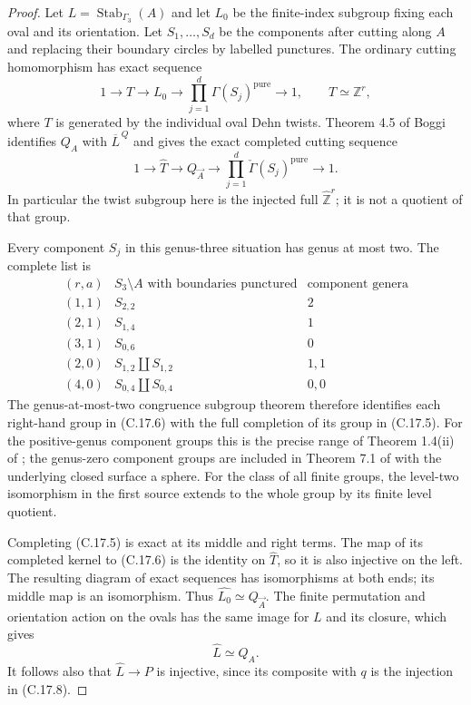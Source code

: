 \begin{proof}
Let $L=\operatorname{Stab}_{\Gamma_3}(A)$ and let $L_0$ be
the finite-index subgroup fixing each oval and its orientation.
Let $S_1,\ldots,S_d$ be the components after cutting along
$A$ and replacing their boundary circles by labelled
punctures. The ordinary cutting homomorphism has exact
sequence
\[
 1\longrightarrow T\longrightarrow L_0
       \longrightarrow\prod_{j=1}^{d}\Gamma(S_j)^{\mathrm{pure}}
       \longrightarrow1,\qquad T\simeq\mathbb Z^r,
\tag{C.17.5}
\]
where $T$ is generated by the individual oval Dehn twists.
Theorem 4.5 of Boggi~\cite{CextraBoggiProcongruence2014}
identifies $Q_A$ with $\overline L^{\,Q}$ and gives the exact
completed cutting sequence
\[
 1\longrightarrow\widehat T\longrightarrow Q_{\vec A}
       \longrightarrow\prod_{j=1}^{d}
                  \check\Gamma(S_j)^{\mathrm{pure}}
       \longrightarrow1.
\tag{C.17.6}
\]
In particular the twist subgroup here is the injected full
$\widehat{\mathbb Z}^{r}$; it is not a quotient of that group.

Every component $S_j$ in this genus-three situation has genus
at most two. The complete list is
\[
\begin{array}{c|c|c}
 (r,a)&S_3\setminus A\text{ with boundaries punctured}
       &\text{component genera}\\ \hline
 (1,1)&S_{2,2}&2\\
 (2,1)&S_{1,4}&1\\
 (3,1)&S_{0,6}&0\\
 (2,0)&S_{1,2}\amalg S_{1,2}&1,1\\
 (4,0)&S_{0,4}\amalg S_{0,4}&0,0
\end{array}
\tag{C.17.7}
\]
The genus-at-most-two congruence subgroup theorem therefore
identifies each right-hand group in (C.17.6) with the full
completion of its group in (C.17.5). For the positive-genus
component groups this is the precise range of Theorem 1.4(ii)
of \cite{CextraBoggiCongruence2020}; the genus-zero component
groups are included in Theorem 7.1 of
\cite{CextraBoggiHyperelliptic} with the underlying closed
surface a sphere. For the class of all finite groups, the
level-two isomorphism in the first source extends to the
whole group by its finite level quotient.

Completing (C.17.5) is exact at its middle and right terms.
The map of its completed kernel to (C.17.6) is the identity
on $\widehat T$, so it is also injective on the left. The
resulting diagram of exact sequences has isomorphisms at
both ends; its middle map is an isomorphism. Thus
$\widehat{L_0}\simeq Q_{\vec A}$. The finite permutation and
orientation action on the ovals has the same image for
$L$ and its closure, which gives
\[
 \widehat L\simeq Q_A.
\tag{C.17.8}
\]
It follows also that $\widehat L\to P$ is injective, since
its composite with $q$ is the injection in (C.17.8).


\end{proof}
